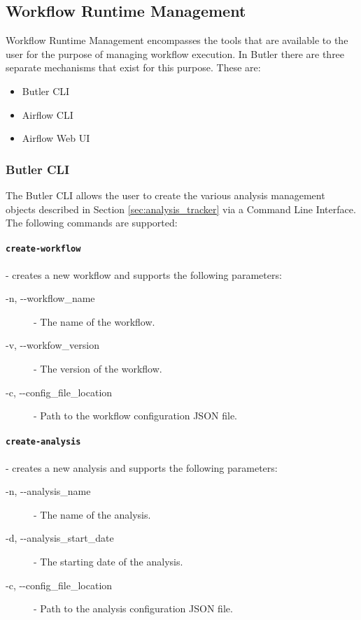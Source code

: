 \subsection{Workflow Runtime Management}

Workflow Runtime Management encompasses the tools that are available to the user for the purpose of managing workflow execution. In Butler there are three separate mechanisms that exist for this purpose. These are:

\begin{itemize}
\item Butler CLI
\item Airflow CLI
\item Airflow Web UI
\end{itemize}

\subsubsection{Butler CLI}

The Butler CLI allows the user to create the various analysis management objects described in Section \ref{sec:analysis_tracker} via a Command Line Interface. The following commands are supported:

\paragraph{\texttt{create-workflow}} - creates a new workflow and supports the following parameters:
\begin{description}
\item [-n, -\--workflow\_name] - The name of the workflow.
\item [-v, -\--workfow\_version] - The version of the workflow.
\item [-c, -\--config\_file\_location] - Path to the workflow configuration JSON file.
\end{description}

\paragraph{\texttt{create-analysis}} - creates a new analysis and supports the following parameters:
\begin{description}
\item [-n, -\--analysis\_name] - The name of the analysis.
\item [-d, -\--analysis\_start\_date] - The starting date of the analysis.
\item [-c, -\--config\_file\_location] - Path to the analysis configuration JSON file.
\end{description}

